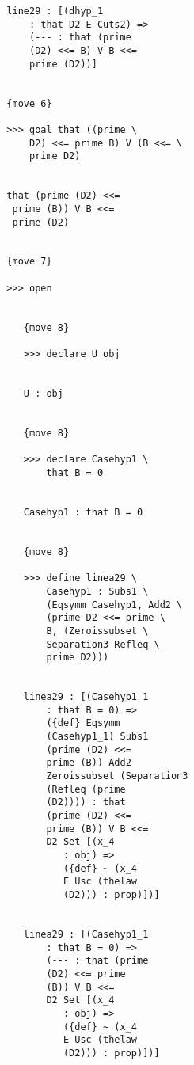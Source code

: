 \documentclass[12pt]{article}
\begin{document}
\begin{verbatim}
                     line29 : [(dhyp_1 
                         : that D2 E Cuts2) => 
                         (--- : that (prime 
                         (D2) <<= B) V B <<= 
                         prime (D2))]


                     {move 6}

                     >>> goal that ((prime \
                         D2) <<= prime B) V (B <<= \
                         prime D2)


                     that (prime (D2) <<= 
                      prime (B)) V B <<= 
                      prime (D2)


                     {move 7}

                     >>> open


                        {move 8}

                        >>> declare U obj


                        U : obj


                        {move 8}

                        >>> declare Casehyp1 \
                            that B = 0


                        Casehyp1 : that B = 0


                        {move 8}

                        >>> define linea29 \
                            Casehyp1 : Subs1 \
                            (Eqsymm Casehyp1, Add2 \
                            (prime D2 <<= prime \
                            B, (Zeroissubset \
                            Separation3 Refleq \
                            prime D2)))


                        linea29 : [(Casehyp1_1 
                            : that B = 0) => 
                            ({def} Eqsymm 
                            (Casehyp1_1) Subs1 
                            (prime (D2) <<= 
                            prime (B)) Add2 
                            Zeroissubset (Separation3 
                            (Refleq (prime 
                            (D2)))) : that 
                            (prime (D2) <<= 
                            prime (B)) V B <<= 
                            D2 Set [(x_4 
                               : obj) => 
                               ({def} ~ (x_4 
                               E Usc (thelaw 
                               (D2))) : prop)])]


                        linea29 : [(Casehyp1_1 
                            : that B = 0) => 
                            (--- : that (prime 
                            (D2) <<= prime 
                            (B)) V B <<= 
                            D2 Set [(x_4 
                               : obj) => 
                               ({def} ~ (x_4 
                               E Usc (thelaw 
                               (D2))) : prop)])]



\end{verbatim}
\end{document}
